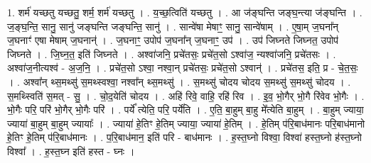 \documentclass[17pt]{extarticle}
\begin{document}
1. शर्म॑ यच्छतु यच्छतु॒ शर्म॒ शर्म॑ यच्छतु । . य॒च्छ॒त्विति॑ यच्छतु । . आ ज॑ङ्घन्ति जङ्घ॒न्त्या ज॑ङ्घन्ति । . ज॒ङ्घ॒न्ति॒ सानु॒ सानु॑ जङ्घन्ति जङ्घन्ति॒ सानु॑ । . सान्वे॑षा मेषाꣳ॒॒ सानु॒ सान्वे॑षाम् । . ए॒षा॒म् ज॒घना᳚न् ज॒घनाꣳ॑ एषा मेषाम् ज॒घनान्॑ । . ज॒घनाꣳ॒॒ उपोप॑ ज॒घना᳚न् ज॒घनाꣳ॒॒ उप॑ । . उप॑ जिघ्नते जिघ्नत॒ उपोप॑ जिघ्नते । . जि॒घ्न॒त॒ इति॑ जिघ्नते । . अश्वा॑जनि॒ प्रचे॑तसः॒ प्रचे॑त॒सो ऽश्वा॑ज॒ न्यश्वा॑जनि॒ प्रचे॑तसः । . अश्वा॑ज॒नीत्यश्व॑ - अ॒ज॒नि॒ । . प्रचे॑त॒सो ऽश्वा॒ नश्वा॒न् प्रचे॑तसः॒ प्रचे॑त॒सो ऽश्वान्॑ । . प्रचे॑तस॒ इति॒ प्र - चे॒त॒सः॒ । . अश्वा᳚न् थ्स॒मथ्सु॑ स॒मथ्स्वश्वा॒ नश्वा᳚न् थ्स॒मथ्सु॑ । . स॒मथ्सु॑ चोदय चोदय स॒मथ्सु॑ स॒मथ्सु॑ चोदय । . स॒मथ्स्विति॑ स॒मत् - सु॒ । . चो॒द॒येति॑ चोदय । . अहि॑ रिवे॒ वाहि॒ रहि॑ रिव । . इ॒व॒ भो॒गैर् भो॒गै रि॑वेव भो॒गैः । . भो॒गैः परि॒ परि॑ भो॒गैर् भो॒गैः परि॑ । . पर्ये᳚ त्येति॒ परि॒ पर्ये॑ति । . ए॒ति॒ बा॒हुम् बा॒हु मे᳚त्येति बा॒हुम् । . बा॒हुम् ज्याया॒ ज्याया॑ बा॒हुम् बा॒हुम् ज्यायाः᳚ । . ज्याया॑ हे॒तिꣳ हे॒तिम् ज्याया॒ ज्याया॑ हे॒तिम् । . हे॒तिम् प॑रि॒बाध॑मानः परि॒बाध॑मानो हे॒तिꣳ हे॒तिम् प॑रि॒बाध॑मानः । . प॒रि॒बाध॑मान॒ इति॑ परि - बाध॑मानः । . ह॒स्त॒घ्नो विश्वा॒ विश्वा॑ हस्त॒घ्नो ह॑स्त॒घ्नो विश्वा᳚ । . ह॒स्त॒घ्न इति॑ हस्त - घ्नः । \newline
\end{document}
